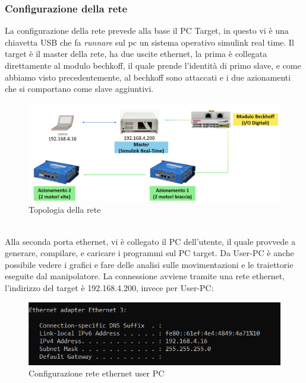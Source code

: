 \subsubsection{Configurazione della rete}
La configurazione della rete prevede alla base il PC Target, in questo vi è una chiavetta USB che fa \textit{runnare} sul pc un sistema operativo simulink real time. Il target è il master della rete, ha due uscite ethernet, la prima è collegata direttamente al modulo bechkoff, il quale prende l'identità di primo slave, e come abbiamo visto precedentemente, al bechkoff sono attaccati e i due azionamenti che si comportano come slave aggiuntivi.
\begin{figure}[ht]
\begin{center}
    \includegraphics[scale=0.5]{Immagini/Sperimentale/Topology.PNG}
    \caption{Topologia della rete}
    \label{fig:NetTopology1}
\end{center}
\end{figure}
\\Alla seconda porta ethernet, vi è collegato il PC dell'utente, il quale provvede a generare, compilare, e caricare i programmi sul PC target. Da User-PC è anche possibile vedere i grafici e fare delle analisi sulle movimentazioni e le traiettorie eseguite dal manipolatore. La connessione avviene tramite una rete ethernet, l'indirizzo del target è 192.168.4.200, invece per User-PC:
\begin{figure}[ht]
\begin{center}
    \includegraphics[scale=0.7]{Immagini/Sperimentale/ConfEthernet.png}
    \caption{Configurazione rete ethernet user PC}
    \label{fig:ConfEthernet}
\end{center}
\end{figure}
